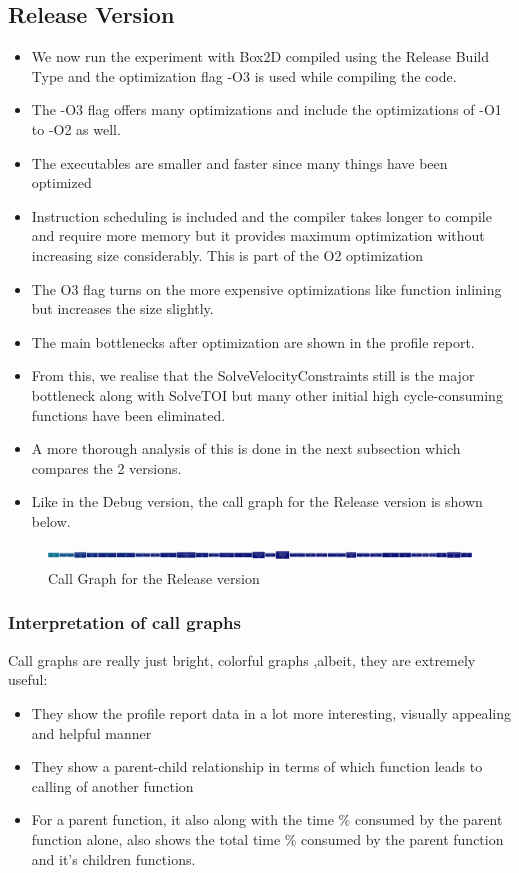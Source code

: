 \documentclass[11pt]{article}
\begin{document}
	\subsection{Release Version}
		\begin{itemize}
		\item We now run the experiment with Box2D compiled using the Release Build Type and the optimization flag -O3 is used while compiling the code. 
		\item The -O3 flag offers many optimizations and include the optimizations of -O1 to -O2 as well. 
		
		\item The executables are smaller and faster since many things have been optimized
	
		\item Instruction scheduling is included and the compiler takes longer to compile and require more memory but it provides maximum optimization without increasing size considerably. This is part of the O2 optimization
		\item The O3 flag turns on the more expensive optimizations like function inlining but increases the size slightly.
		
		\item The main bottlenecks after optimization are shown in the profile report.
		\item From this, we realise that the SolveVelocityConstraints still is the major bottleneck along with SolveTOI but many other initial high cycle-consuming functions have been eliminated. 
		\item A more thorough analysis of this is done in the next subsection which compares the 2 versions.
		\item Like in the Debug version, the call graph for the Release version is shown below.
		\end{itemize}
	\begin{figure}[h!]
	\caption{Call Graph for the Release version}
	\centering
	\includegraphics[width=\linewidth,height=0.5cm]{images/callgraphrelease}
	\end{figure}
	\subsubsection{Interpretation of call graphs}
		Call graphs are really just bright, colorful graphs ,albeit, they are extremely useful:
			\begin{itemize}
				\item They show the profile report data in a lot more interesting, visually appealing and helpful manner
				\item They show a parent-child relationship in terms of which function leads to calling of another function
				\item For a parent function, it also along with the time \% consumed by the parent function alone, also shows the total time \% consumed by the parent function and it's children functions.
			\end{itemize}
\end{document}
